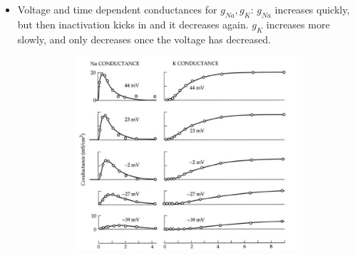 \documentclass[english,11pt]{article}
\begin{document}
\begin{itemize}
\item Voltage and time dependent conductances for $g_{Na}, g_{K}$:
\subitem $g_{Na}$ increases quickly, but then inactivation kicks in and it decreases again.
\subitem $g_K$ increases more slowly, and only decreases once the voltage has decreased.
\begin{figure}[H]
        \centering
        \begin{subfigure}[b]{0.65\textwidth}
                \centering
\includegraphics[width=\textwidth]{images/5_4.jpg}
        \end{subfigure}%
        ~
        \begin{subfigure}[b]{0.35\textwidth}
                \centering

\end{subfigure}
\end{figure}
\end{itemize}
\end{document}

